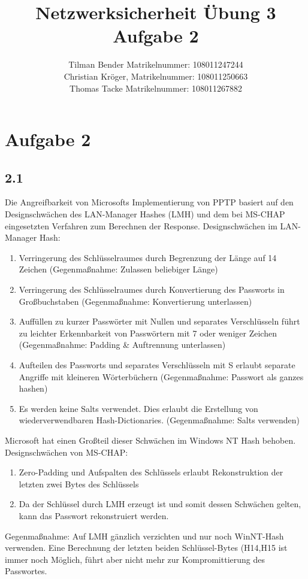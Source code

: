 \documentclass[10pt,a4paper]{article}
\author{Tilman Bender   Matrikelnummer: 108011247244\\Christian Kröger,   Matrikelnummer: 108011250663\\Thomas Tacke  Matrikelnummer: 108011267882}
\title{Netzwerksicherheit Übung 3 Aufgabe 2}
\begin{document}
\maketitle

\section*{Aufgabe 2}
\subsection*{2.1}
Die Angreifbarkeit von Microsofts Implementierung von PPTP basiert auf den Designschwächen des LAN-Manager Hashes (LMH) und dem bei MS-CHAP eingesetzten Verfahren zum Berechnen der Response.
Designschwächen im LAN-Manager Hash:
\begin{enumerate}
\item Verringerung des Schlüsselraumes durch Begrenzung der Länge auf 14 Zeichen (Gegenmaßnahme: Zulassen beliebiger Länge)
\item Verringerung des Schlüsselraumes durch Konvertierung des Passworts in Großbuchstaben (Gegenmaßnahme: Konvertierung unterlassen)
\item Auffüllen zu kurzer Passwörter mit Nullen und separates Verschlüsseln führt zu leichter Erkennbarkeit von Passwörtern mit 7 oder weniger Zeichen (Gegenmaßnahme: Padding \& Auftrennung unterlassen)
\item Aufteilen des Passworts und separates Verschlüsseln mit S erlaubt separate Angriffe mit kleineren Wörterbüchern (Gegenmaßnahme: Passwort als ganzes hashen)
\item Es werden keine Salts verwendet. Dies erlaubt die Erstellung von wiederverwendbaren Hash-Dictionaries. (Gegenmaßnahme: Salts verwenden)
\end{enumerate}
Microsoft hat einen Großteil dieser Schwächen im Windows NT Hash behoben.
Designschwächen von MS-CHAP:
\begin{enumerate}
	\item Zero-Padding und Aufspalten des Schlüssels erlaubt Rekonstruktion der letzten zwei Bytes des Schlüssels
	\item Da der Schlüssel durch LMH erzeugt ist und somit dessen Schwächen gelten, kann das Passwort rekonstruiert werden.
\end{enumerate}
Gegenmaßnahme: Auf LMH gänzlich verzichten und nur noch WinNT-Hash verwenden. Eine Berechnung der letzten beiden Schlüssel-Bytes (H14,H15 ist immer noch Möglich, führt aber nicht mehr zur Kompromittierung des Passwortes.
\end{document}
